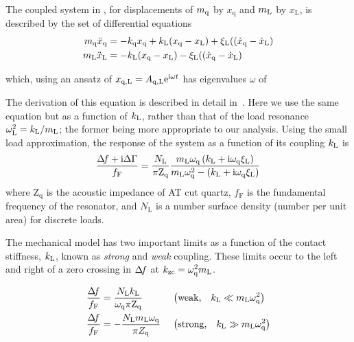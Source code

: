 The coupled system in , for displacements of
$m_\mathrm{q}$ by $x_\mathrm{q}$ and $m_\mathrm{L}$ by $x_\mathrm{L}$, is described by the
set of differential equations
\begin{align}
 m_\mathrm{q} \ddot{x}_\mathrm{q} &= -k_\mathrm{q} x_\mathrm{q} +k_\mathrm{L} (x_\mathrm{q}-x_\mathrm{L}) + \xi_\mathrm{L} ((\dot{x}_\mathrm{q}-\dot{x}_\mathrm{L})\\
 m_\mathrm{L} \ddot{x}_\mathrm{L} &= -k_\mathrm{L} (x_\mathrm{q}-x_\mathrm{L}) - \xi_\mathrm{L} ((\dot{x}_\mathrm{q}-\dot{x}_\mathrm{L})
\end{align}

which, using an ansatz of
$x_{\mathrm{q},\mathrm{L}}=A_{\mathrm{q},\mathrm{L}}{\mathrm{e}}^{{\mathrm{i}} \omega t}$ has
eigenvalues $\omega$ of

The derivation of this equation is described in detail in~\cite{olsson2012probing}.  Here we use the same equation but as a function
of $k_\mathrm{L}$, rather than that of the load resonance
$\omega_\mathrm{L}^2=k_\mathrm{L}/m_\mathrm{L}$; the former being more appropriate to our
analysis.  Using the small load approximation, the response of the system
as a function of its coupling $k_\mathrm{L}$ is
\begin{equation}
\frac{\Delta\!f + {\mathrm{i}} \Delta \Gamma}{f_\mathrm{F}} = \frac{N_\mathrm{L}}{\pi
\mathrm{Z}_\mathrm{q}}
\frac{m_\mathrm{L} \omega_\mathrm{q} \left( k_\mathrm{L} + {\mathrm{i}}
\omega_\mathrm{q} \xi_\mathrm{L}\right) }
{m_\mathrm{L} \omega_\mathrm{q}^2 - \left(k_\mathrm{L} + {\mathrm{i}}
\omega_\mathrm{q} \xi_\mathrm{L}\right)}
\label{eqn:suppmastereq}
\end{equation}
where $\mathrm{Z}_\mathrm{q}$ is the acoustic impedance of AT cut quartz,
$f_\mathrm{F}$ is the fundamental frequency of the resonator, and
$N_\mathrm{L}$ is a number surface density (number per unit area) for discrete
loads.

The mechanical model has two important limits as a function of the contact
stiffness, $k_\mathrm{L}$, known as \textit{strong} and \textit{weak} coupling.
These limits occur to the left and right of a zero crossing in $\Delta\!f$ at
$k_\mathrm{zc}=\omega_\mathrm{q}^2 m_\mathrm{L}$.

\vspace{-\baselineskip}
\vspace{-\parskip}
\begin{align}
\frac{\Delta\!f}{f_\mathrm{F}}&= 
\frac{N_\mathrm{L} k_\mathrm{L}}
{\omega_\mathrm{q}\pi \mathrm{Z}_\mathrm{q}}
&\,&\left(\text{weak,}\quad k_\mathrm{L}\ll m_\mathrm{L}
\omega_\mathrm{q}^2\right)
\label{eqn:couplinguy1}
\\
\frac{\Delta\!f}{f_\mathrm{F}}&=  -\frac{N_\mathrm{L}
m_\mathrm{L} \omega_\mathrm{q}}{\pi Z_\mathrm{q}}
&\,&\left(\text{strong,}\quad k_\mathrm{L}\gg m_\mathrm{L}
\omega_\mathrm{q}^2\right)
\label{eqn:couplinguy2}
\end{align}

